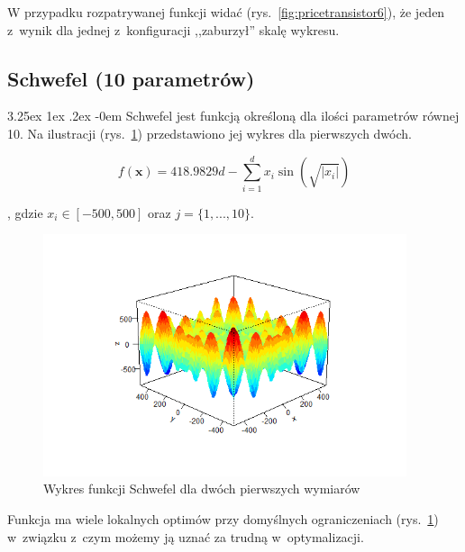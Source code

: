 \documentclass[11pt, a4paper]{article}
\makeatletter
\newcommand{\fbi}{\leavevmode{\parindent=1em\indent}}
\renewcommand\paragraph{\@startsection{paragraph}{5}{\z@}
  {3.25ex \@plus1ex \@minus.2ex}
  {-0em}
  {\normalfont\normalsize\bfseries}}
\makeatother
\begin{document}
\fbi
W przypadku rozpatrywanej funkcji widać (rys.~\ref{fig:pricetransistor6}), że jeden z~wynik dla jednej z~konfiguracji ,,zaburzył'' skalę wykresu.

\newpage
\subsection{Schwefel (10 parametrów)}
\paragraph{}
Schwefel jest funkcją określoną dla ilości parametrów równej 10. Na ilustracji (rys.~\ref{fig:schwefel1}) przedstawiono jej wykres dla pierwszych dwóch.

\begin{equation}\label{eq:schwefel}
f(\boldsymbol{x}) = 418.9829d - \sum_{i=1}^{d} x_i \sin(\sqrt{|x_i|})
\end{equation}

, gdzie $ x_i \in [-500, 500]$ oraz $j = \{1, ..., 10\}$.

\begin{figure}[H]
	\begin{center}
		\includegraphics[width=0.95\textwidth]{./assets/Schwefel1.png}
		\caption{Wykres funkcji Schwefel dla dwóch pierwszych wymiarów}
		\label{fig:schwefel1}
	\end{center}
\end{figure}

\fbi
Funkcja ma wiele lokalnych optimów przy domyślnych ograniczeniach (rys.~\ref{fig:schwefel1}) w~związku z~czym możemy ją uznać za trudną w~optymalizacji. 
\end{document}
